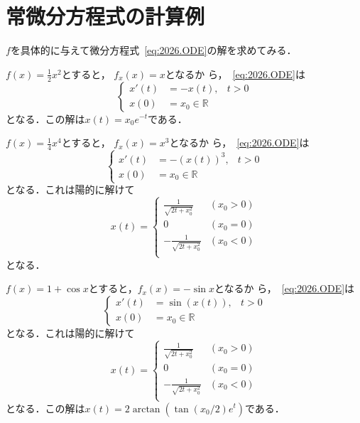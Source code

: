  \section{常微分方程式の計算例}

 $f$を具体的に与えて微分方程式~\eqref{eq:2026.ODE}の解を求めてみる．

 \begin{example}
  $f(x) = \frac{1}{2}x^2$とすると， $f_x(x) = x$となるか
  ら，~\eqref{eq:2026.ODE}は
  \begin{equation}
   \left\{
    \begin{aligned}
     x'(t) &= -x(t), & t > 0 \\
     x(0) &= x_0 \in \mathbb{R}
    \end{aligned}
	 \right.
  \end{equation}
  となる．この解は$x(t)=x_0e^{-t}$である．
 \end{example}

 \begin{example}
  $f(x) =  \frac{1}{4}x^4$とすると， $f_x(x) = x^3$となるか
  ら，~\eqref{eq:2026.ODE}は
  \begin{equation}
   \left\{
    \begin{aligned}
     x'(t) &= -(x(t))^3, & t > 0 \\
     x(0) &= x_0 \in \mathbb{R}
    \end{aligned}
	 \right.
  \end{equation}
  となる．これは陽的に解けて
  \begin{equation}
   x(t)
    =
    \begin{cases}
     \frac{1}{\sqrt{2t+x_0^2}} & (x_0>0)\\
     0 & (x_0=0) \\
     -\frac{1}{\sqrt{2t+x_0^2}} & (x_0<0)\\
    \end{cases}
  \end{equation}
  となる．
 \end{example}

 \begin{example}
  $f(x) = 1 + \cos x$とすると，$f_x(x) =-\sin x$となるか
  ら，~\eqref{eq:2026.ODE}は
  \begin{equation}
   \left\{
    \begin{aligned}
     x'(t) &= \sin(x(t)), & t > 0 \\
     x(0) &= x_0 \in \mathbb{R}
    \end{aligned}
	 \right.
  \end{equation}
  となる．これは陽的に解けて
  \begin{equation}
   x(t)
    =
    \begin{cases}
     \frac{1}{\sqrt{2t+x_0^2}} & (x_0>0)\\
     0 & (x_0=0) \\
     -\frac{1}{\sqrt{2t+x_0^2}} & (x_0<0)\\
    \end{cases}
  \end{equation}
  となる．この解は$x(t) = 2 \arctan(\tan(x_0/2) e^t)$である．
 \end{example}

